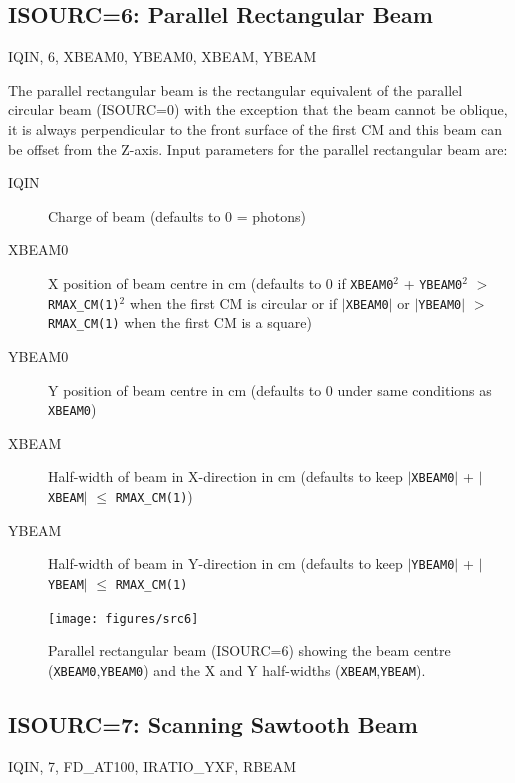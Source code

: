 \documentclass[12pt,twoside]{article}
\newcommand{\cen}[1]{\begin{center} #1 \end{center}                   }
\begin{document}
\clearpage
\subsection{ISOURC=6: Parallel Rectangular Beam}
\cen{IQIN, 6, XBEAM0, YBEAM0, XBEAM, YBEAM}
 
The parallel rectangular beam is the rectangular equivalent of the
parallel circular beam (ISOURC=0) with the exception that the beam
cannot be oblique, it is always perpendicular to
the front surface of the first CM and this beam can be offset from the
Z-axis.
Input parameters for the parallel rectangular beam are:
\begin{description}
\item [IQIN] Charge of beam (defaults to 0 = photons)
\item [XBEAM0] X position of beam centre in cm (defaults to 0 if
\verb+XBEAM0+$^2$ + \verb+YBEAM0+$^2$ $>$ \verb+RMAX_CM(1)+$^2$ when
the first CM is circular
or if $|$\verb+XBEAM0+$|$ or $|$\verb+YBEAM0+$|$ $>$ \verb+RMAX_CM(1)+
 when the first CM is a square)
\item [YBEAM0] Y position of beam centre in cm (defaults to 0 under same
conditions as \verb+XBEAM0+)
\item [XBEAM] Half-width of beam in X-direction in cm (defaults to keep
$|$\verb+XBEAM0+$|$ + $|$\verb+XBEAM+$|$ $\leq$ \verb+RMAX_CM(1)+)

\item [YBEAM] Half-width of beam in Y-direction in cm (defaults to keep
$|$\verb+YBEAM0+$|$ + $|$\verb+YBEAM+$|$ $\leq$ \verb+RMAX_CM(1)+

\end{description}
\begin{figure}[hbp]
\leavevmode
\begin{center}
\mbox{}\hspace{0cm}
\texttt{[image: figures/src6]}
\caption[ISOURC=6: Parallel rectangular beam.]
{Parallel rectangular beam (ISOURC=6) showing the beam centre
({\tt XBEAM0},{\tt YBEAM0}) and the X and Y half-widths
 ({\tt  XBEAM},{\tt YBEAM}).}
\label{fig_src6}
\end{center}
\end{figure}

\clearpage

\subsection{ISOURC=7: Scanning Sawtooth Beam}
\cen{IQIN, 7, FD\_AT100, IRATIO\_YXF, RBEAM}
 
\end{document}
